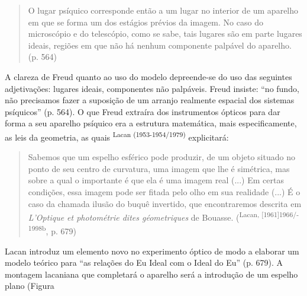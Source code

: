 \begin{multicols}{2}
\par
{
}
\par
\begin{quote}\par{}O lugar psíquico corresponde então a um lugar no interior de um aparelho em que se forma um dos estágios prévios da imagem.\allowbreak{} No caso do microscópio e do telescópio,\allowbreak{} como se sabe,\allowbreak{} tais lugares são em parte lugares ideais,\allowbreak{} regiões em que não há nenhum componente palpável do aparelho.\allowbreak{} (\allowbreak{}p.\allowbreak{} 564)\allowbreak{}\end{quote}\par{}A clareza de Freud quanto ao uso do modelo depreende-\allowbreak{}se do uso das seguintes adjetivações:\allowbreak{} lugares ideais,\allowbreak{} componentes não palpáveis.\allowbreak{} Freud insiste:\allowbreak{} “no fundo,\allowbreak{} não precisamos fazer a suposição de um arranjo realmente espacial dos sistemas psíquicos” (\allowbreak{}p.\allowbreak{} 564)\allowbreak{}.\allowbreak{} O que Freud extraíra dos instrumentos ópticos para dar forma a seu aparelho psíquico era a estrutura matemática,\allowbreak{} mais especificamente,\allowbreak{} as leis da geometria,\allowbreak{} as quais \textsuperscript{Lacan (\allowbreak{}1953-\allowbreak{}1954\fshyp{}1979)\allowbreak{}} explicitará:\allowbreak{}\begin{quote}\par{}Sabemos que um espelho esférico pode produzir,\allowbreak{} de um objeto situado no ponto de seu centro de curvatura,\allowbreak{} uma imagem que lhe é simétrica,\allowbreak{} mas sobre a qual o importante é que ela é uma imagem real (\allowbreak{}.\allowbreak{}.\allowbreak{}.\allowbreak{})\allowbreak{} Em certas condições,\allowbreak{} essa imagem pode ser fitada pelo olho em sua realidade (\allowbreak{}.\allowbreak{}.\allowbreak{}.\allowbreak{})\allowbreak{} É o caso da chamada ilusão do buquê invertido,\allowbreak{} que encontraremos descrita em \textit{L’Optique et photométrie dites géometriques }de Bouasse.\allowbreak{} (\allowbreak{}\textsuperscript{Lacan,\allowbreak{} [1961]1966\fshyp{}1998b},\allowbreak{} p.\allowbreak{} 679)\allowbreak{}\end{quote}\par{}Lacan introduz um elemento novo no experimento óptico de modo a elaborar um modelo teórico para “as relações do Eu Ideal com o Ideal do Eu” (\allowbreak{}p.\allowbreak{} 679)\allowbreak{}.\allowbreak{} A montagem lacaniana que completará o aparelho será a introdução de um espelho plano (\allowbreak{}Figura 
\end{multicols}
